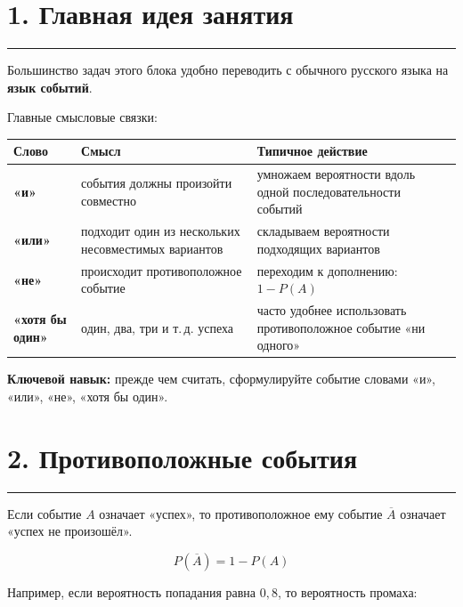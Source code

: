 \documentclass[a4paper,12pt]{article}
\newcommand{\accentline}{%
    \vspace{0.3em}
    {\color{accent}\rule{\linewidth}{0.7pt}}
    \vspace{0.5em}
}
\newcommand{\important}[1]{\textbf{\color{darkaccent}#1}}
\newcommand{\prob}[1]{P\!\left(#1\right)}
\begin{document}

\section*{\color{darkaccent}1. Главная идея занятия}
\accentline

Большинство задач этого блока удобно переводить с обычного русского языка
на \important{язык событий}.

Главные смысловые связки:

\begin{center}
\renewcommand{\arraystretch}{1.35}
\begin{tabularx}{0.91\linewidth}{@{}>{\bfseries}l X X@{}}
\toprule
Слово & Смысл & Типичное действие \\
\midrule
«и» &
события должны произойти совместно &
умножаем вероятности вдоль одной последовательности событий \\

«или» &
подходит один из нескольких несовместимых вариантов &
складываем вероятности подходящих вариантов \\

«не» &
происходит противоположное событие &
переходим к дополнению: $1-P(A)$ \\

«хотя бы один» &
один, два, три и т.\,д. успеха &
часто удобнее использовать противоположное событие «ни одного» \\
\bottomrule
\end{tabularx}
\end{center}

\important{Ключевой навык:} прежде чем считать, сформулируйте событие словами
«и», «или», «не», «хотя бы один».


\section*{\color{darkaccent}2. Противоположные события}
\accentline

Если событие $A$ означает «успех», то противоположное ему событие
$\overline A$ означает «успех не произошёл».

\[
\boxed{\prob{\overline A}=1-\prob{A}}
\]

Например, если вероятность попадания равна $0,8$, то вероятность промаха:
\end{document}
